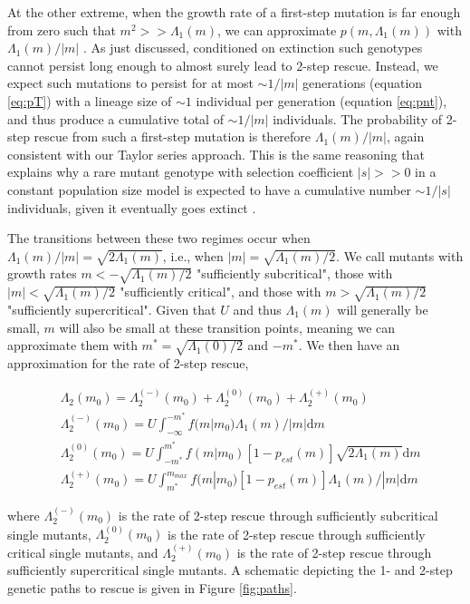 \documentclass[9pt,twocolumn,twoside,lineno]{gsajnl}
\begin{document}
At the other extreme, when the growth rate of a first-step mutation is far enough from zero such that $m^2 >> \Lambda_1(m)$, we can approximate $p(m,\Lambda_1(m))$ with $\Lambda_1(m)/ |m|$ \citep[c.f.\ equation A.4c in ][]{Iwasa2004}.
As just discussed, conditioned on extinction such genotypes cannot persist long enough to almost surely lead to 2-step rescue.
Instead, we expect such mutations to persist for at most $\sim1/|m|$ generations (equation \ref{eq:pT}) with a lineage size of $\sim1$ individual per generation (equation \ref{eq:pnt}), and thus produce a cumulative total of $\sim 1/|m|$ individuals. 
The probability of 2-step rescue from such a first-step mutation is therefore $\Lambda_1(m)/ |m|$, again consistent with our Taylor series approach.
This is the same reasoning that explains why a rare mutant genotype with selection coefficient $|s|>>0$ in a constant population size model is expected to have a cumulative number $\sim1/|s|$ individuals, given it eventually goes extinct \citep{Weissman2009}. 

The transitions between these two regimes occur when $\Lambda_1(m)/ |m| = \sqrt{2\Lambda_1(m)}$, i.e., when $|m| = \sqrt{\Lambda_1(m)/2}$.
We call mutants with growth rates $m < -\sqrt{\Lambda_1(m)/2}$ "sufficiently subcritical", those with $|m| < \sqrt{\Lambda_1(m)/2}$ "sufficiently critical", and those with $m > \sqrt{\Lambda_1(m)/2}$ "sufficiently supercritical".
Given that $U$ and thus $\Lambda_1(m)$ will generally be small, $m$ will also be small at these transition points, meaning we can approximate them with $m^* = \sqrt{\Lambda_1(0)/2}$ and $-m^*$.
We then have an approximation for the rate of 2-step rescue, 

\begin{equation}\label{eq:p2tilde}
\begin{aligned}
&\Lambda_2(m_0) = \Lambda_2^{(-)}(m_0) + \Lambda_2^{(0)}(m_0) + \Lambda_2^{(+)}(m_0)\\
& \Lambda_2^{(-)}(m_0) = U \int_{-\infty}^{-m^*} f(m|m_0)  \Lambda_1(m)/ |m| \mathrm{d}m\\
& \Lambda_2^{(0)}(m_0) = U \int_{-m^*}^{m^*} f(m|m_0) \left[ 1 - p_{est}(m) \right] \sqrt{2\Lambda_1(m)} \mathrm{d}m\\
& \Lambda_2^{(+)}(m_0) = U \int_{m^*}^{m_{max}} f(m|m_0) \left[ 1 - p_{est}(m) \right] \Lambda_1(m)/ |m| \mathrm{d}m
\end{aligned}
\end{equation}

\noindent where $\Lambda_2^{(-)}(m_0)$ is the rate of 2-step rescue through sufficiently subcritical single mutants, $\Lambda_2^{(0)}(m_0)$ is the rate of 2-step rescue through sufficiently critical single mutants, and $\Lambda_2^{(+)}(m_0)$ is the rate of 2-step rescue through sufficiently supercritical single mutants.
A schematic depicting the 1- and 2-step genetic paths to rescue is given in Figure \ref{fig:paths}.
\end{document}
